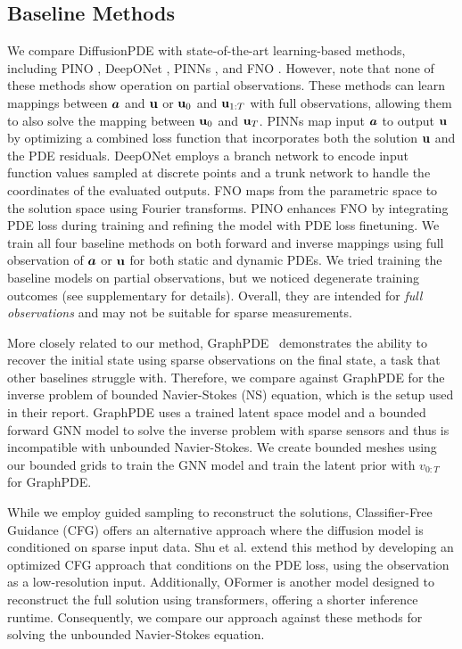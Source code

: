 \vspace{-0.4em}
\subsection{Baseline Methods}
\vspace{-0.3em}
We compare DiffusionPDE with state-of-the-art learning-based methods, including PINO \cite{li2021physics}, DeepONet \cite{lu2021learning}, PINNs \cite{raissi2019physics}, and FNO \cite{li2020fourier}. However, note that none of these methods show operation on partial observations. These methods can learn mappings between $\boldsymbol{a}$ and $\mathbf{u}$ or $\mathbf{u}_0$ and $\mathbf{u}_{1:T}$ with full observations, allowing them to also solve the mapping between $\mathbf{u}_0$ and $\mathbf{u}_T$. PINNs map input $\boldsymbol{a}$ to output $\mathbf{u}$ by optimizing a combined loss function that incorporates both the solution $\mathbf{u}$ and the PDE residuals. DeepONet employs a branch network to encode input function values sampled at discrete points and a trunk network to handle the coordinates of the evaluated outputs. FNO maps from the parametric space to the solution space using Fourier transforms. PINO enhances FNO by integrating PDE loss during training and refining the model with PDE loss finetuning. We train all four baseline methods on both forward and inverse mappings using full observation of $\boldsymbol{a}$ or $\mathbf{u}$ for both static and dynamic PDEs. We tried training the baseline models on partial observations, but we noticed degenerate training outcomes (see supplementary for details). Overall, they are intended for {\em full observations} and may not be suitable for sparse measurements. 

More closely related to our method, GraphPDE~\cite{zhao2022learning} demonstrates the ability to recover the initial state using sparse observations on the final state, a task that other baselines struggle with. Therefore, we compare against GraphPDE for the inverse problem of bounded Navier-Stokes (NS) equation, which is the setup used in their report. GraphPDE uses a trained latent space model and a bounded forward GNN model to solve the inverse problem with sparse sensors and thus is incompatible with unbounded Navier-Stokes. We create bounded meshes using our bounded grids to train the GNN model and train the latent prior with $v_{0:T}$ for GraphPDE.



While we employ guided sampling to reconstruct the solutions, Classifier-Free Guidance (CFG) \cite{ho2022classifier} offers an alternative approach where the diffusion model is conditioned on sparse input data. Shu et al. \cite{shu2023physics} extend this method by developing an optimized CFG approach that conditions on the PDE loss, using the observation as a low-resolution input. Additionally, OFormer \cite{li2022transformer} is another model designed to reconstruct the full solution using transformers, offering a shorter inference runtime. Consequently, we compare our approach against these methods for solving the unbounded Navier-Stokes equation.


